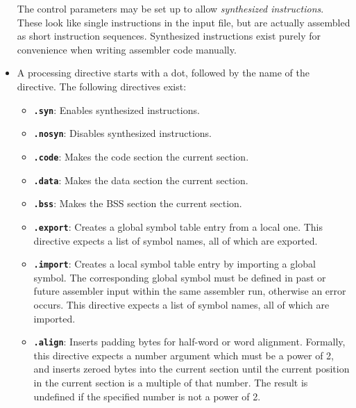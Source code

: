 \begin{itemize}
The control parameters may be set up to allow {\it synthesized instructions}. These look like single instructions in the input file, but are actually assembled as short instruction sequences. Synthesized instructions exist purely for convenience when writing assembler code manually.
\item A processing directive starts with a dot, followed by the name of the directive. The following directives exist:
\begin{itemize}
\item {\tt \bf .syn}: Enables synthesized instructions.
\item {\tt \bf .nosyn}: Disables synthesized instructions.
\item {\tt \bf .code}: Makes the code section the current section.
\item {\tt \bf .data}: Makes the data section the current section.
\item {\tt \bf .bss}: Makes the BSS section the current section.
\item {\tt \bf .export}: Creates a global symbol table entry from a local one. This directive expects a list of symbol names, all of which are exported.
\item {\tt \bf .import}: Creates a local symbol table entry by importing a global symbol. The corresponding global symbol must be defined in past or future assembler input within the same assembler run, otherwise an error occurs. This directive expects a list of symbol names, all of which are imported.
\item {\tt \bf .align}: Inserts padding bytes for half-word or word alignment. Formally, this directive expects a number argument which must be a power of 2, and inserts zeroed bytes into the current section until the current position in the current section is a multiple of that number. The result is undefined if the specified number is not a power of 2.


\end{itemize}
\end{itemize}

